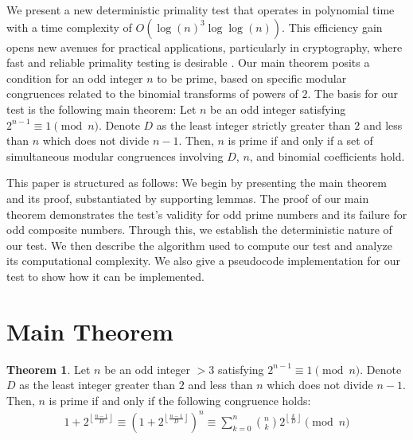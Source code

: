 \documentclass{article}
\theoremstyle{plain}
\theoremstyle{definition}
\newtheorem{theorem}{Theorem}
\begin{document}
We present a new deterministic primality test that operates in polynomial time with a time complexity of $O(\log(n)^3 \log\log(n))$. This efficiency gain opens new avenues for practical applications, particularly in cryptography, where fast and reliable primality testing is desirable \cite{pomerance1984}. Our main theorem posits a condition for an odd integer \( n \) to be prime, based on specific modular congruences related to the binomial transforms of powers of $2$. The basis for our test is the following main theorem: Let \( n \) be an odd integer satisfying \( 2^{n-1} \equiv 1 \pmod{n} \). Denote \( D \) as the least integer strictly greater than \( 2 \) and less than \( n \) which does not divide \( n-1 \). Then, \( n \) is prime if and only if a set of simultaneous modular congruences involving \( D \), \( n \), and binomial coefficients hold.

This paper is structured as follows: We begin by presenting the main theorem and its proof, substantiated by supporting lemmas. The proof of our main theorem demonstrates the test's validity for odd prime numbers and its failure for odd composite numbers. Through this, we establish the deterministic nature of our test. We then describe the algorithm used to compute our test and analyze its computational complexity. We also give a pseudocode implementation for our test to show how it can be implemented.

\section{Main Theorem}

\begin{theorem}
\label{theorem:1}
    Let $n$ be an odd integer $> 3$ satisfying $2^{n-1} \equiv 1 \pmod{n}$. Denote $D$ as the least integer greater than $2$ and less than $n$ which does not divide $n-1$. Then, $n$ is prime if and only if the following congruence holds:
    \begin{align}
        1 + 2^{\left\lfloor \frac{n-1}{D} \right\rfloor} \equiv \left(1 + 2^{\left\lfloor \frac{n-1}{D} \right\rfloor}\right)^{n} \equiv \sum_{k=0}^{n} \binom{n}{k}2^{\left\lfloor \frac{k}{D} \right\rfloor} \pmod{n}
    \end{align}
\end{theorem}
\end{document}
